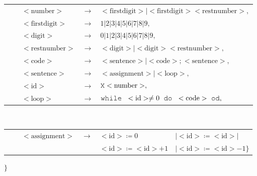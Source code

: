 \documentclass[11pt, a4paper]{exam}
\begin{document}
\begin{questions}
\begin{parts}
\begin{solution}
            \begin{tabular}{ l l l l l }
                      &    &$<\text{number}>    $ & $\rightarrow$ & $<\text{firstdigit}>|<\text{firstdigit}> <\text{restnumber}>,$\\
                      &    &$<\text{firstdigit}>$ & $\rightarrow$ & $1| 2| 3| 4| 5| 6| 7| 8| 9,$\\
                      &    &$<\text{digit}>     $ & $\rightarrow$ & $0| 1| 2| 3| 4| 5| 6| 7| 8| 9,$\\
                      &    &$<\text{restnumber}>$ & $\rightarrow$ & $<\text{digit}>|<\text{digit}><\text{restnumber}>,$\\
                      &    &$<\text{code}>      $ & $\rightarrow$ & $<\text{sentence}>|<\text{code}>;<\text{sentence}>,$\\
                      &    &$<\text{sentence}>  $ & $\rightarrow$ & $<\text{assignment}>|<\text{loop}>,$\\
                      &    &$<\text{id}>        $ & $\rightarrow$ & $\X{} <\text{number}>,$\\
                      &    &$<\text{loop}>      $ & $\rightarrow$ & $\while <\text{id}>  \not = 0 \; \dokw <\text{code}> \od,$
            \end{tabular}\\
            \begin{tabular}{ l l l l l l }
                      &    &$<\text{assignment}>$ & $\rightarrow$ & $<\text{id}> \coloneqq 0              $ & $|<\text{id}> \coloneqq <\text{id}>|$\\
                      &    &                      &               & $<\text{id}> \coloneqq <\text{id}> + 1$ & $|<\text{id}> \coloneqq <\text{id}> - 1\}$\\
            \end{tabular}
            
            $\}$
        
        \end{solution}


\end{parts}
\end{questions}
\end{document}
